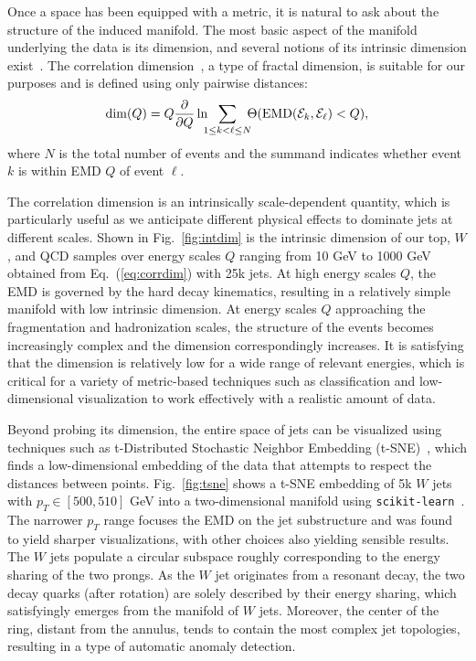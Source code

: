 \documentclass[aps,prl,twocolumn,preprintnumbers,nofootinbib,longbibliography,floatfix]{revtex4-1}
\DeclareRobustCommand{\Fig}[1]{Fig.~\ref{#1}}
\DeclareRobustCommand{\Eq}[1]{Eq.~(\ref{#1})}
\begin{document}
Once a space has been equipped with a metric, it is natural to ask about the structure of the induced manifold.
%
The most basic aspect of the manifold underlying the data is its dimension, and several notions of its intrinsic dimension exist~\cite{CAMASTRA20032945}.
%
The correlation dimension~\cite{Grassberger:1983zz,DBLP:conf/nips/Kegl02}, a type of fractal dimension, is suitable for our purposes and is defined using only pairwise distances:
%
\begin{equation}\label{eq:corrdim}
\dim(Q) = Q\frac{\partial}{\partial Q}\ln\hspace{-0.5em}\sum_{1\le k < \ell \le N}\hspace{-0.5em}\Theta(\text{EMD}(\mathcal E_k, \mathcal E_\ell) < Q),
\end{equation}
where $N$ is the total number of events and the summand indicates whether event $k$ is within EMD $Q$ of event $\ell$.


The correlation dimension is an intrinsically scale-dependent quantity, which is particularly useful as we anticipate different physical effects to dominate jets at different scales.
%
Shown in \Fig{fig:intdim} is the intrinsic dimension of our top, $W$, and QCD samples over energy scales $Q$ ranging from 10 GeV to 1000 GeV obtained from \Eq{eq:corrdim} with 25k jets.
%
At high energy scales $Q$, the EMD is governed by the hard decay kinematics, resulting in a relatively simple manifold with low intrinsic dimension.
%
At energy scales $Q$ approaching the fragmentation and hadronization scales, the structure of the events becomes increasingly complex and the dimension correspondingly increases.
%
It is satisfying that the dimension is relatively low for a wide range of relevant energies, which is critical for a variety of metric-based techniques such as classification and low-dimensional visualization to work effectively with a realistic amount of data.


Beyond probing its dimension, the entire space of jets can be visualized using techniques such as t-Distributed Stochastic Neighbor Embedding (t-SNE)~\cite{vanDerMaaten2008,DBLP:journals/jmlr/Maaten09,
DBLP:journals/ml/MaatenH12,DBLP:journals/jmlr/Maaten14}, which finds a low-dimensional embedding of the data that attempts to respect the distances between points.
%
\Fig{fig:tsne} shows a t-SNE embedding of 5k $W$ jets with $p_T\in [500,510]$ GeV into a two-dimensional manifold using {\tt scikit-learn}~\cite{scikit-learn}.
%
The narrower $p_T$ range focuses the EMD on the jet substructure and was found to yield sharper visualizations, with other choices also yielding sensible results.
%
The $W$ jets populate a circular subspace roughly corresponding to the energy sharing of the two prongs.
%
As the $W$ jet originates from a resonant decay, the two decay quarks (after rotation) are solely described by their energy sharing, which satisfyingly emerges from the manifold of $W$ jets.
%
Moreover, the center of the ring, distant from the annulus, tends to contain the most complex jet topologies, resulting in a type of automatic anomaly detection.
\end{document}

